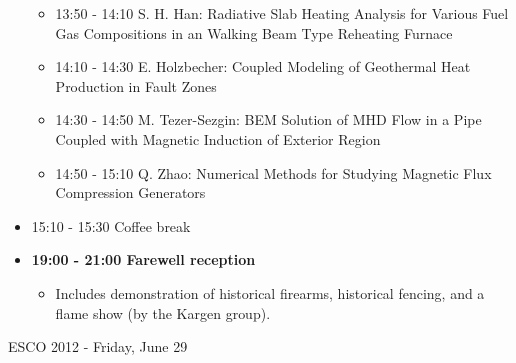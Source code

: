 \documentclass[10pt, A4]{article}%
\begin{document}
\begin{itemize}
\begin{itemize}
    \item 13:50 - 14:10 S. H. Han: Radiative Slab Heating Analysis for Various Fuel Gas Compositions in an Walking Beam Type Reheating Furnace
    \item 14:10 - 14:30 E. Holzbecher: Coupled Modeling of Geothermal Heat Production in Fault Zones 
    \item 14:30 - 14:50 M. Tezer-Sezgin: BEM Solution of MHD Flow in a Pipe Coupled with Magnetic Induction of Exterior Region 
    \item 14:50 - 15:10 Q. Zhao: Numerical Methods for Studying Magnetic Flux Compression Generators 
  \end{itemize}
  \item 15:10 - 15:30 Coffee break
  \item {\bf 19:00 - 21:00 Farewell reception}
    \begin{itemize}
     \item Includes demonstration of historical firearms, historical fencing, and a flame show (by the Kargen group).
  \end{itemize} 
\end{itemize}

\newpage

\centerline{\huge ESCO 2012 - Friday, June 29}
\vspace{4mm}
\end{document}
